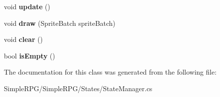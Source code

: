 \begin{DoxyCompactItemize}
\item 
\hypertarget{class_simple_r_p_g_1_1_states_1_1_state_manager_a087db2b322e7df7dd718fe9bfa8de005}{void {\bfseries update} ()}\label{class_simple_r_p_g_1_1_states_1_1_state_manager_a087db2b322e7df7dd718fe9bfa8de005}

\item 
\hypertarget{class_simple_r_p_g_1_1_states_1_1_state_manager_a79b249bd1e60b228ad9666b02b6308cf}{void {\bfseries draw} (Sprite\-Batch sprite\-Batch)}\label{class_simple_r_p_g_1_1_states_1_1_state_manager_a79b249bd1e60b228ad9666b02b6308cf}

\item 
\hypertarget{class_simple_r_p_g_1_1_states_1_1_state_manager_a1d346eab57b9633c88d051d555919921}{void {\bfseries clear} ()}\label{class_simple_r_p_g_1_1_states_1_1_state_manager_a1d346eab57b9633c88d051d555919921}

\item 
\hypertarget{class_simple_r_p_g_1_1_states_1_1_state_manager_a11cac71d35a247ebc836576c779f8b61}{bool {\bfseries is\-Empty} ()}\label{class_simple_r_p_g_1_1_states_1_1_state_manager_a11cac71d35a247ebc836576c779f8b61}

\end{DoxyCompactItemize}


The documentation for this class was generated from the following file\-:\begin{DoxyCompactItemize}
\item 
Simple\-R\-P\-G/\-Simple\-R\-P\-G/\-States/State\-Manager.\-cs\end{DoxyCompactItemize}
